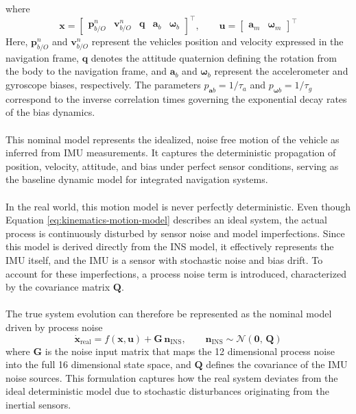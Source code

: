 where
\begin{equation}
    \mathbf{x} =
    \begin{bmatrix}
        \mathbf{p}_{b/O}^{n} & \mathbf{v}_{b/O}^{n} & \mathbf{q} & \mathbf{a}_b & \mathbf{\omega}_b
    \end{bmatrix}^\top,
    \qquad
    \mathbf{u} =
    \begin{bmatrix}
        \mathbf{a}_m & \boldsymbol{\omega}_m
    \end{bmatrix}^\top
    \label{eq:kinematics-motion-model-states}
\end{equation}
Here, $\mathbf{p}_{b/O}^{n}$ and $\mathbf{v}_{b/O}^{n}$ represent the vehicles position and velocity expressed in the navigation frame, $\mathbf{q}$ denotes the attitude quaternion defining the rotation from the body to the navigation frame, and $\mathbf{a}_b$ and $\mathbf{\omega}_b$ represent the accelerometer and gyroscope biases, respectively. The parameters $p_{\mathbf{a}b} = 1/\tau_a$ and $p_{\mathbf{\omega}b} = 1/\tau_g$ correspond to the inverse correlation times governing the exponential decay rates of the bias dynamics.  
\\ \\
This nominal model represents the idealized, noise free motion of the vehicle as inferred from IMU measurements. It captures the deterministic propagation of position, velocity, attitude, and bias under perfect sensor conditions, serving as the baseline dynamic model for integrated navigation systems.  
\\ \\
In the real world, this motion model is never perfectly deterministic. Even though Equation \ref{eq:kinematics-motion-model} describes an ideal system, the actual process is continuously disturbed by sensor noise and model imperfections. Since this model is derived directly from the INS model, it effectively represents the IMU itself, and the IMU is a sensor with stochastic noise and bias drift. To account for these imperfections, a process noise term is introduced, characterized by the covariance matrix $\mathbf{Q}$.  
\\ \\
The true system evolution can therefore be represented as the nominal model driven by process noise
$$
    \dot{\mathbf{x}}_{\text{real}} = f(\mathbf{x}, \mathbf{u}) + \mathbf{G}\,\mathbf{n}_{\text{INS}},
    \qquad
    \mathbf{n}_{\text{INS}} \sim \mathcal{N}(\mathbf{0},\, \mathbf{Q})
$$
where $\mathbf{G}$ is the noise input matrix that maps the 12 dimensional process noise into the full 16 dimensional state space, and $\mathbf{Q}$ defines the covariance of the IMU noise sources. This formulation captures how the real system deviates from the ideal deterministic model due to stochastic disturbances originating from the inertial sensors.
